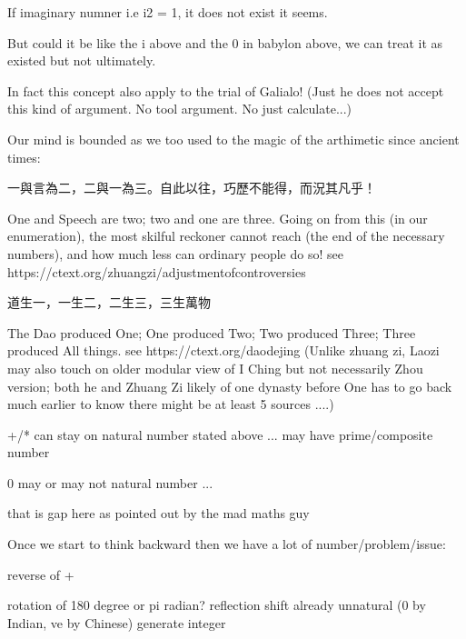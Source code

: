 \documentclass[letterpaper,10pt,english]{jupyterBook}
\begin{document}
\begin{sphinxVerbatim}[commandchars=\\\{\}]
If imaginary numner i.e i\PYGZca{}2 = \PYGZhy{}1,  it does not exist it seems.

But could it be like the i above and the 0 in babylon above, 
we can treat it as existed but not ultimately.  

In fact this concept also apply to the trial of Galialo!  
(Just he does not accept this kind of argument.  No tool argument.  No just calculate...)
\end{sphinxVerbatim}

\begin{sphinxVerbatim}[commandchars=\\\{\}]
Our mind is bounded as we too used to the magic of the arthimetic since ancient times:
    
    一與言為二，二與一為三。自此以往，巧歷不能得，而況其凡乎！
    
        One and Speech are two; two and one are three. 
        Going on from this (in our enumeration), the most skilful reckoner cannot reach
        (the end of the necessary numbers), and how much less can ordinary people do so!
        see https://ctext.org/zhuangzi/adjustment\PYGZhy{}of\PYGZhy{}controversies
    
    道生一，一生二，二生三，三生萬物 
    
        \PYGZdq{}The Dao produced One; One produced Two; Two produced Three; Three produced All things.\PYGZdq{}
            see https://ctext.org/dao\PYGZhy{}de\PYGZhy{}jing
        (Unlike zhuang zi, Laozi may also touch on older modular view of I Ching
         but not necessarily Zhou version; both he and Zhuang Zi likely of one dynasty before
         One has to go back much earlier to know there might be at least 5 sources ....)

    +/* can stay on natural number stated above ... may have prime/composite number
    
    0 may or may not natural number ...
    
    \PYGZhy{}\PYGZhy{}\PYGZhy{}\PYGZhy{}\PYGZhy{}\PYGZhy{} that is gap here as pointed out by the \PYGZdq{}mad\PYGZdq{} maths guy
    
    Once we start to think backward then we have a lot of number/problem/issue:
    
    \PYGZhy{}   reverse of +
    
        rotation of 180 degree or pi radian?
        reflection
        shift
        already unnatural (0 by Indian, \PYGZhy{}ve by Chinese)
        generate integer
    

\end{sphinxVerbatim}
\end{document}
